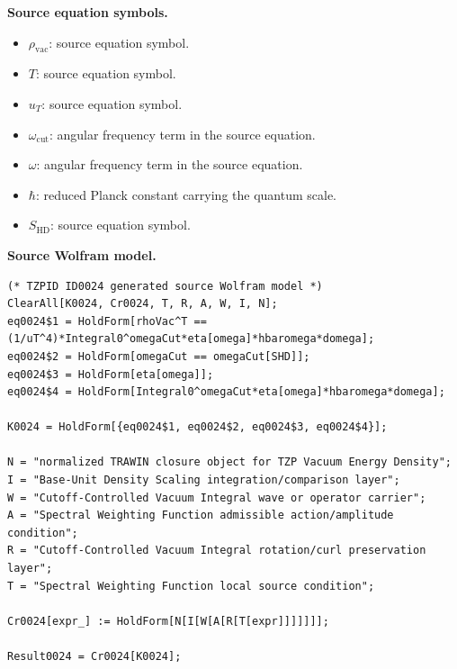 \begin{minipage}[t]{0.49\linewidth}
\begingroup
\small
\raggedright
\textbf{Source equation symbols.}\par
\begin{itemize}[leftmargin=1.35em,itemsep=1pt,topsep=1pt,parsep=0pt]
    \item $\rho_{\mathrm{vac}}$: source equation symbol.
    \item $T$: source equation symbol.
    \item $u_{T}$: source equation symbol.
    \item $\omega_{\mathrm{cut}}$: angular frequency term in the source equation.
    \item $\omega$: angular frequency term in the source equation.
    \item $\hbar$: reduced Planck constant carrying the quantum scale.
    \item $S_{\mathrm{HD}}$: source equation symbol.
\end{itemize}
\endgroup
\end{minipage}\hfill
\begin{minipage}[t]{0.47\linewidth}
\begingroup
\scriptsize
\raggedright
\textbf{Source Wolfram model.}\par
\begin{Verbatim}[fontsize=\tiny,breaklines=true,breakanywhere=true]
(* TZPID ID0024 generated source Wolfram model *)
ClearAll[K0024, Cr0024, T, R, A, W, I, N];
eq0024$1 = HoldForm[rhoVac^T == (1/uT^4)*Integral0^omegaCut*eta[omega]*hbaromega*domega];
eq0024$2 = HoldForm[omegaCut == omegaCut[SHD]];
eq0024$3 = HoldForm[eta[omega]];
eq0024$4 = HoldForm[Integral0^omegaCut*eta[omega]*hbaromega*domega];

K0024 = HoldForm[{eq0024$1, eq0024$2, eq0024$3, eq0024$4}];

N = "normalized TRAWIN closure object for TZP Vacuum Energy Density";
I = "Base-Unit Density Scaling integration/comparison layer";
W = "Cutoff-Controlled Vacuum Integral wave or operator carrier";
A = "Spectral Weighting Function admissible action/amplitude condition";
R = "Cutoff-Controlled Vacuum Integral rotation/curl preservation layer";
T = "Spectral Weighting Function local source condition";

Cr0024[expr_] := HoldForm[N[I[W[A[R[T[expr]]]]]]];

Result0024 = Cr0024[K0024];
\end{Verbatim}
\endgroup
\end{minipage}

